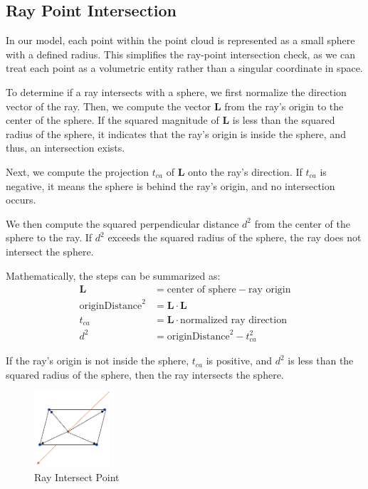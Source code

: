 \documentclass[11pt, a4paper,oneside,chapterprefix=false]{scrbook}
\begin{document}
\subsection{Ray Point Intersection}

In our model, each point within the point cloud is represented as a small sphere with a defined radius. This simplifies the ray-point intersection check, as we can treat each point as a volumetric entity rather than a singular coordinate in space.

\vspace{10pt}

To determine if a ray intersects with a sphere, we first normalize the direction vector of the ray. Then, we compute the vector \( \mathbf{L} \) from the ray's origin to the center of the sphere. If the squared magnitude of \( \mathbf{L} \) is less than the squared radius of the sphere, it indicates that the ray's origin is inside the sphere, and thus, an intersection exists.

\vspace{10pt}

Next, we compute the projection \( t_{ca} \) of \( \mathbf{L} \) onto the ray's direction. If \( t_{ca} \) is negative, it means the sphere is behind the ray's origin, and no intersection occurs.

\vspace{10pt}

We then compute the squared perpendicular distance \( d^2 \) from the center of the sphere to the ray. If \( d^2 \) exceeds the squared radius of the sphere, the ray does not intersect the sphere.

\vspace{10pt}

Mathematically, the steps can be summarized as:
\begin{align*}
	\mathbf{L} &= \text{center of sphere} - \text{ray origin} \\
	\text{originDistance}^2 &= \mathbf{L} \cdot \mathbf{L} \\
	t_{ca} &= \mathbf{L} \cdot \text{normalized ray direction} \\
	d^2 &= \text{originDistance}^2 - t_{ca}^2
\end{align*}

If the ray's origin is not inside the sphere, \( t_{ca} \) is positive, and \( d^2 \) is less than the squared radius of the sphere, then the ray intersects the sphere.

\begin{minipage}{\textwidth}
	\begin{figure}[H]
		\centering
		\includegraphics*[width=0.25\textwidth]{figures/intersect polygon.png}
		\caption{Ray Intersect Point}
		\label{fig:ray intersect point}
	\end{figure}
\end{minipage}
\end{document}
